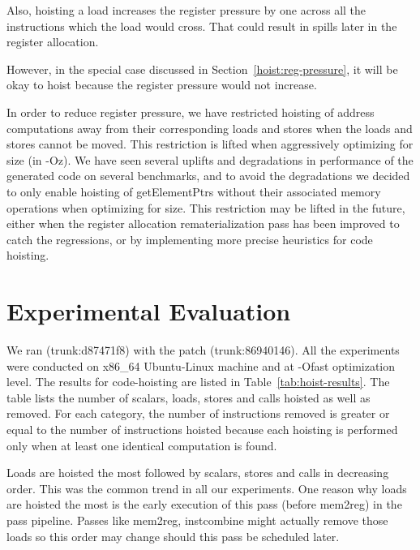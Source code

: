 \documentclass{sig-alternate}
\begin{document}
Also, hoisting a load increases the register pressure by one across all the
instructions which the load would cross. That could result in spills later in
the register allocation.

However, in the special case discussed in Section~\ref{hoist:reg-pressure}, it
will be okay to hoist because the register pressure would not increase.

In order to reduce register pressure, we have restricted hoisting of address
computations away from their corresponding loads and stores when the loads and
stores cannot be moved.  This restriction is lifted when aggressively optimizing
for size (in -Oz).  We have seen several uplifts and degradations in performance
of the generated code on several benchmarks, and to avoid the degradations we
decided to only enable hoisting of getElementPtrs without their associated
memory operations when optimizing for size.  This restriction may be lifted in
the future, either when the register allocation rematerialization pass has been
improved to catch the regressions, or by implementing more precise heuristics
for code hoisting.

\section{Experimental Evaluation}
\label{sec:experimental-results}
We ran \LLVMTestSuite{} (trunk:d87471f8) with the patch (trunk:86940146). All
the experiments were conducted on x86\_64 Ubuntu-Linux machine and at -Ofast
optimization level.  The results for code-hoisting are listed in
Table~\ref{tab:hoist-results}. The table lists the number of scalars, loads,
stores and calls hoisted as well as removed. For each category, the number of
instructions removed is greater or equal to the number of instructions hoisted
because each hoisting is performed only when at least one identical computation
is found.

Loads are hoisted the most followed by scalars, stores and calls in decreasing
order.  This was the common trend in all our experiments. One reason why loads
are hoisted the most is the early execution of this pass (before mem2reg) in the
\LLVM{} pass pipeline. Passes like mem2reg, instcombine might actually remove
those loads so this order may change should this pass be scheduled later.
\end{document}
